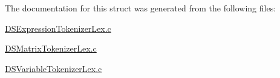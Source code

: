 The documentation for this struct was generated from the following files:\begin{DoxyCompactItemize}
\item 
\hyperlink{_d_s_expression_tokenizer_lex_8c}{DSExpressionTokenizerLex.c}\item 
\hyperlink{_d_s_matrix_tokenizer_lex_8c}{DSMatrixTokenizerLex.c}\item 
\hyperlink{_d_s_variable_tokenizer_lex_8c}{DSVariableTokenizerLex.c}\end{DoxyCompactItemize}
